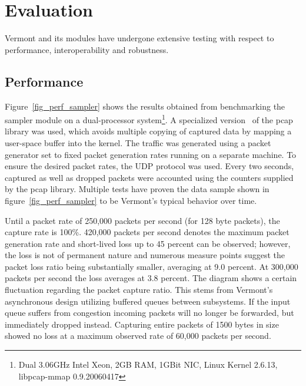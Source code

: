 \section{Evaluation}
\label{sec:evaluation}

Vermont and its modules have undergone extensive testing with respect to performance, interoperability and robustness.

\subsection{Performance}

Figure~\ref{fig_perf_sampler} shows the results obtained from benchmarking the sampler module on a dual-processor system\footnote{Dual 3.06GHz Intel Xeon, 2GB RAM, 1GBit NIC, Linux Kernel 2.6.13, libpcap-mmap 0.9.20060417}.
A specialized version~\cite{pcap-mmap} of the pcap library was used, which avoids multiple copying of captured data by mapping a user-space buffer into the kernel.
The traffic was generated using a packet generator set to fixed packet generation rates running on a separate machine. To ensure the desired packet rates, the UDP protocol was used.
Every two seconds, captured as well as dropped packets were accounted using the counters supplied by the pcap library. Multiple tests have proven the data sample shown in figure~\ref{fig_perf_sampler} to be Vermont's typical behavior over time.

Until a packet rate of 250,000 packets per second (for 128 byte packets), the capture rate is 100\%.
420,000 packets per second denotes the maximum packet generation rate and short-lived loss up to 45 percent can be observed; however, the loss is not of permanent nature and numerous measure points suggest the packet loss ratio being substantially smaller, averaging at 9.0 percent. At 300,000 packets per second the loss averages at 3.8 percent.
The diagram shows a certain fluctuation regarding the packet capture ratio. This stems from Vermont's asynchronous design utilizing buffered queues between subsystems. If the input queue suffers from congestion incoming packets will no longer be forwarded, but immediately dropped instead.
Capturing entire packets of 1500 bytes in size showed no loss at a maximum observed rate of 60,000 packets per second.

